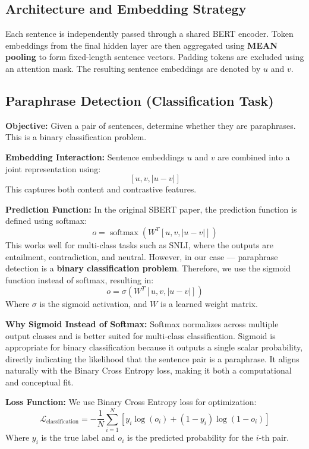 \subsection{Architecture and Embedding Strategy}
Each sentence is independently passed through a shared BERT encoder. Token embeddings from the final hidden layer are then aggregated using \textbf{MEAN pooling} to form fixed-length sentence vectors. Padding tokens are excluded using an attention mask. The resulting sentence embeddings are denoted by $u$ and $v$.

\subsection{Paraphrase Detection (Classification Task)}

\textbf{Objective:} Given a pair of sentences, determine whether they are paraphrases. This is a binary classification problem.

\textbf{Embedding Interaction:} Sentence embeddings $u$ and $v$ are combined into a joint representation using:
\[
[u, v, |u - v|]
\]
This captures both content and contrastive features.

\textbf{Prediction Function:} In the original SBERT paper, the prediction function is defined using softmax:
\[
o = \operatorname{softmax}(W^T [u, v, |u - v|])
\]
This works well for multi-class tasks such as SNLI, where the outputs are entailment, contradiction, and neutral. However, in our case — paraphrase detection is a \textbf{binary classification problem}. Therefore, we use the sigmoid function instead of softmax, resulting in:
\[
o = \sigma(W^T [u, v, |u - v|])
\]
Where $\sigma$ is the sigmoid activation, and $W$ is a learned weight matrix.

\textbf{Why Sigmoid Instead of Softmax:} Softmax normalizes across multiple output classes and is better suited for multi-class classification. Sigmoid is appropriate for binary classification because it outputs a single scalar probability, directly indicating the likelihood that the sentence pair is a paraphrase. It aligns naturally with the Binary Cross Entropy loss, making it both a computational and conceptual fit.

\textbf{Loss Function:} We use Binary Cross Entropy loss for optimization:
\[
\mathcal{L}_{\text{classification}} = - \frac{1}{N} \sum_{i=1}^{N} \left[ y_i \log(o_i) + (1 - y_i) \log(1 - o_i) \right]
\]
Where $y_i$ is the true label and $o_i$ is the predicted probability for the $i$-th pair.

